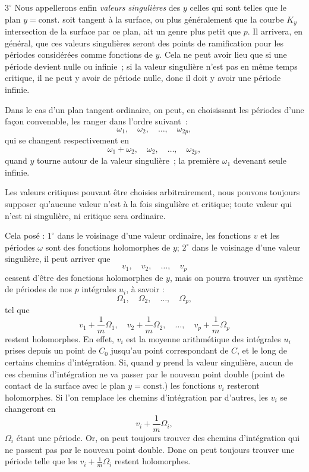 \documentclass{article}
\begin{document}
$3^\circ$ Nous appellerons enfin \emph{valeurs singulières} des $y$ celles qui sont telles que le plan $y = \text{const.}$ soit tangent à la surface, ou plus généralement que la courbe $K_{y}$ intersection de la surface par ce plan, ait un genre plus petit que $p$. Il arrivera, en général, que ces valeurs singulières seront des points de ramification pour les périodes considérées comme fonctions de $y$. Cela ne peut avoir lieu que si une période devient nulle ou infinie~; si la valeur singulière n'est pas en même temps critique, il ne peut y avoir de période nulle, donc il doit y avoir une période infinie.

Dans le cas d'un plan tangent ordinaire, on peut, en choisissant les périodes d'une façon convenable, les ranger dans l'ordre suivant~:
\[
\omega_{1}, \quad \omega_{2}, \quad \ldots, \quad \omega_{2p},
\]
qui se changent respectivement en
\[
\omega_{1} + \omega_{2}, \quad \omega_{2}, \quad \ldots, \quad \omega_{2p},
\]
quand $y$ tourne autour de la valeur singulière~; la première $\omega_{1}$ devenant seule infinie.

Les valeurs critiques pouvant être choisies arbitrairement, nous pouvons toujours supposer qu'aucune valeur n'est à la fois singulière et critique; toute valeur qui n'est ni singulière, ni critique sera ordinaire.

Cela posé : $1^\circ$ dans le voisinage d'une valeur ordinaire, les fonctions $v$ et les périodes $\omega$ sont des fonctions holomorphes de $y$; $2^\circ$ dans le voisinage d'une valeur singulière, il peut arriver que
\[
v_{1}, \quad v_{2}, \quad \ldots, \quad v_{p}
\]
cessent d'être des fonctions holomorphes de $y$, mais on pourra trouver un système de périodes de nos $p$ intégrales $u_{i}$, à savoir :
\[
\Omega_{1}, \quad \Omega_{2}, \quad \ldots, \quad \Omega_{p},
\]
tel que
\[
v_{1} + \frac{1}{m} \Omega_{1}, \quad v_{2} + \frac{1}{m} \Omega_{2}, \quad \ldots, \quad v_{p} + \frac{1}{m} \Omega_{p}
\]
restent holomorphes. En effet, $v_{i}$ est la moyenne arithmétique des intégrales $u_{i}$ prises depuis un point de $C_{0}$ jusqu'au point correspondant de $C$, et le long de certains chemins d'intégration. Si, quand $y$ prend la valeur singulière, aucun de ces chemins d'intégration ne va passer par le nouveau point double (point de contact de la surface avec le plan $y = \text{const.}$) les fonctions $v_{i}$ resteront holomorphes. Si l'on remplace les chemins d'intégration par d'autres, les $v_{i}$ se changeront en
\[
v_{i} + \frac{1}{m} \Omega_{i},
\]
$\Omega_{i}$ étant une période. Or, on peut toujours trouver des chemins d'intégration qui ne passent pas par le nouveau point double. Donc on peut toujours trouver une période telle que les $v_{i} + \frac{1}{m} \Omega_{i}$ restent holomorphes.
\end{document}
